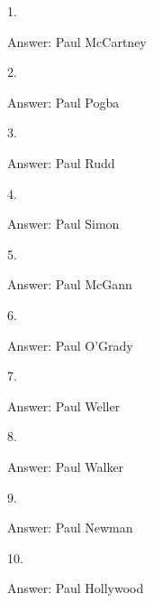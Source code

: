 \documentclass{beamer}
\begin{document}

    \begin{frame}
        1.

        Answer: Paul McCartney
    \end{frame}

    \begin{frame}
        2. 

        Answer: Paul Pogba
    \end{frame}

    \begin{frame}
        3. 

        Answer: Paul Rudd
    \end{frame}

    \begin{frame}
        4. 

        Answer: Paul Simon
    \end{frame}

    \begin{frame}
        5. 

        Answer: Paul McGann
    \end{frame}

    \begin{frame}
        6. 

        Answer: Paul O'Grady
    \end{frame}

    \begin{frame}
        7. 

        Answer: Paul Weller
    \end{frame}

    \begin{frame}
        8. 

        Answer: Paul Walker
    \end{frame}

    \begin{frame}
        9. 

        Answer: Paul Newman
    \end{frame}

    \begin{frame}
        10. 

        Answer: Paul Hollywood
    \end{frame}
\end{document}
